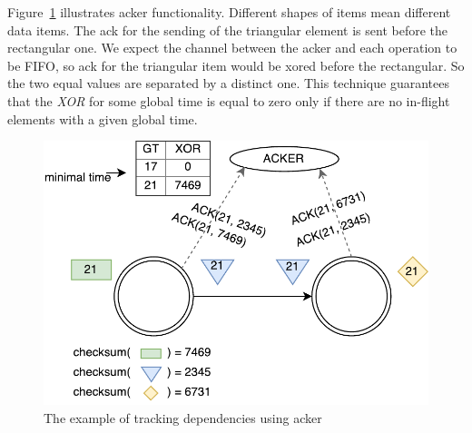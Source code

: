 Figure~\ref{acker} illustrates acker functionality. Different shapes of items mean different data items. The ack for the sending of the triangular element is sent before the rectangular one. We expect the channel between the acker and each operation to be FIFO, so ack for the triangular item would be xored before the rectangular. So the two equal values are separated by a distinct one. This technique guarantees that the {\it XOR} for some global time is equal to zero only if there are no in-flight elements with a given global time.

\begin{figure}[htbp]
  \centering
  \includegraphics[scale=0.58]{pics/acker}
  \caption{The example of tracking dependencies using acker}
  \label {acker}
\end{figure}
